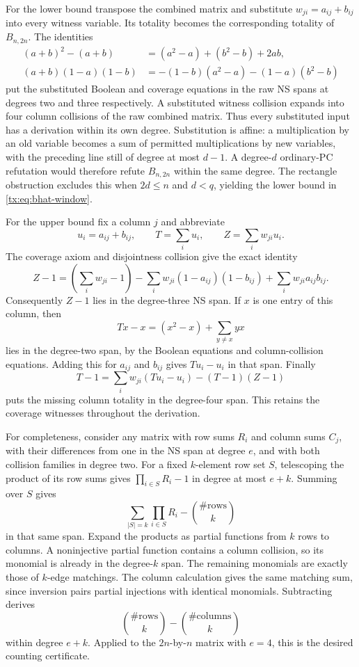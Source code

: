 \documentclass[11pt,a4paper,oneside,openany]{book}
\theoremstyle{definition}\newtheorem{definition}[theorem]{Definition}
\theoremstyle{remark}\newtheorem{remark}[theorem]{Remark}
\numberwithin{equation}{chapter}
\begin{document}
For the lower bound transpose the combined matrix and substitute
$w_{ji}=a_{ij}+b_{ij}$ into every witness variable. Its totality becomes
the corresponding totality of $B_{n,2n}$. The identities
\begin{align*}
(a+b)^2-(a+b)&=(a^2-a)+(b^2-b)+2ab,\\
(a+b)(1-a)(1-b)&=-(1-b)(a^2-a)-(1-a)(b^2-b)
\end{align*}
put the substituted Boolean and coverage equations in the raw NS spans
at degrees two and three respectively. A substituted witness collision
expands into four column collisions of the raw combined matrix.
Thus every substituted input has a derivation within its own degree.
Substitution is affine: a multiplication by an old variable becomes a
sum of permitted multiplications by new variables, with the preceding
line still of degree at most $d-1$. A degree-$d$ ordinary-PC refutation
would therefore refute $B_{n,2n}$ within the same degree. The rectangle
obstruction excludes this when $2d\le n$ and $d<q$, yielding the lower
bound in \eqref{tx:eq:bhat-window}.

For the upper bound fix a column $j$ and abbreviate
\[
 u_i=a_{ij}+b_{ij},\qquad T=\sum_i u_i,\qquad
 Z=\sum_i w_{ji}u_i.
\]
The coverage axiom and disjointness collision give the exact identity
\[
 Z-1=(\sum_iw_{ji}-1)
 -\sum_iw_{ji}(1-a_{ij})(1-b_{ij})
 +\sum_iw_{ji}a_{ij}b_{ij}.
\]
Consequently $Z-1$ lies in the degree-three NS span. If $x$ is one entry
of this column, then
\[
 Tx-x=(x^2-x)+\sum_{y\ne x}yx
\]
lies in the degree-two span, by the Boolean equations and column-collision equations.
Adding this for $a_{ij}$ and $b_{ij}$ gives $Tu_i-u_i$ in that span.
Finally
\[
 T-1=\sum_iw_{ji}(Tu_i-u_i)-(T-1)(Z-1)
\]
puts the missing column totality in the degree-four span. This retains
the coverage witnesses throughout the derivation.

For completeness, consider any matrix with row sums $R_i$ and column
sums $C_j$, with their differences from one in the NS span at degree
$e$, and with both collision families in degree two. For a fixed
$k$-element row set $S$, telescoping the product of its row sums gives
$\prod_{i\in S}R_i-1$ in degree at most $e+k$. Summing over $S$ gives
\[
 \sum_{|S|=k}\prod_{i\in S}R_i-\binom{\#\mathrm{rows}}k
\]
in that same span. Expand the products as partial functions from $k$
rows to columns. A noninjective partial function contains a column
collision, so its monomial is already in the degree-$k$ span.
The remaining monomials are exactly those of $k$-edge matchings.
The column calculation gives the same matching sum, since inversion
pairs partial injections with identical monomials. Subtracting derives
\[
 \binom{\#\mathrm{rows}}k-\binom{\#\mathrm{columns}}k
\]
within degree $e+k$. Applied to the $2n$-by-$n$ matrix with $e=4$, this
is the desired counting certificate.
\end{document}
